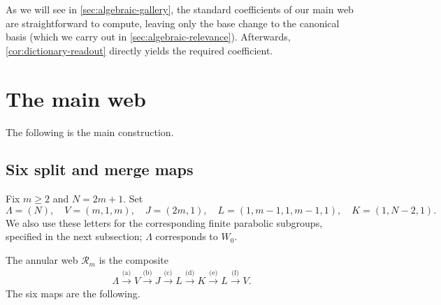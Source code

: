 \documentclass[a4paper,11pt]{amsart}
\numberwithin{equation}{subsection}
\theoremstyle{plain}
\theoremstyle{definition}
\theoremstyle{remark}
\begin{document}
As we will see in \autoref{sec:algebraic-gallery}, the standard coefficients of our main web are straightforward to compute, leaving only the base change to the canonical basis (which we carry out in \autoref{sec:algebraic-relevance}). Afterwards, \autoref{cor:dictionary-readout} directly yields the required coefficient.

\section{The main web}\label{sec:algebraic-gallery}

The following is the main construction.

\subsection{Six split and merge maps}\label{S:MainWeb}

Fix $m\ge2$ and $N=2m+1$. Set
\[
\Lambda=(N),\quad V=(m,1,m),\quad J=(2m,1),\quad
L=(1,m-1,1,m-1,1),\quad K=(1,N-2,1).
\]
We also use these letters for the corresponding finite parabolic
subgroups, specified in the next subsection; $\Lambda$ corresponds
to $W_0$.

The annular web $\mathcal R_m$ is the composite
\begin{gather*}
\Lambda\xrightarrow{\text{(a)}}V
\xrightarrow{\text{(b)}}J
\xrightarrow{\text{(c)}}L
\xrightarrow{\text{(d)}}K
\xrightarrow{\text{(e)}}L
\xrightarrow{\text{(f)}}V.
\end{gather*}
The six maps are the following.
\begingroup
\end{document}
